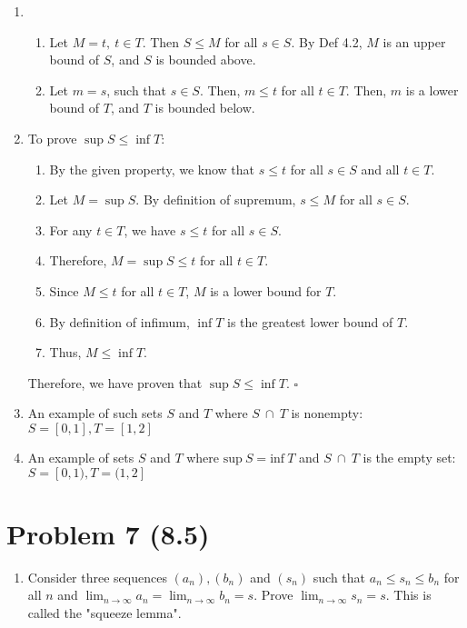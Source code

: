 \documentclass{article}
\begin{document}
\begin{enumerate}
    \item 
    \begin{enumerate}
        \item Let $M=t,\ t \in T$. Then $S\leq M$ for all $s\in S$. By Def 4.2, $M$ is an upper bound of $S$, and $S$ is bounded above.
        \item Let $m=s$, such that $s\in S$. Then, $m\leq t$ for all $t \in T$. Then, $m$ is a lower bound of $T$, and $T$ is bounded below.
    \end{enumerate}
    
    \item To prove $\sup S \leq \inf T$:
    \begin{enumerate}
        \item By the given property, we know that $s \leq t$ for all $s \in S$ and all $t \in T$.
        \item Let $M = \sup S$. By definition of supremum, $s \leq M$ for all $s \in S$.
        \item For any $t \in T$, we have $s \leq t$ for all $s \in S$.
        \item Therefore, $M = \sup S \leq t$ for all $t \in T$.
        \item Since $M \leq t$ for all $t \in T$, $M$ is a lower bound for $T$.
        \item By definition of infimum, $\inf T$ is the greatest lower bound of $T$.
        \item Thus, $M \leq \inf T$.
    \end{enumerate}
    Therefore, we have proven that $\sup S \leq \inf T$. $\square$

    
    \item An example of such sets $S$ and $T$ where $S \ \cap \ T$ is nonempty: $S=[0,1], T=[1,2]$
    
    \item An example of sets $S$ and $T$ where $\text{sup}\ S = \text{inf}\ T$ and $S \ \cap \ T$ is the empty set: $S=[0,1), T=(1,2]$
\end{enumerate}

\section*{Problem 7 (8.5)}
\begin{enumerate}
    \item Consider three sequences $(a_{n}), (b_n)$ and $(s_{n})$ such that $a_{n}\leq s_{n}\leq b_{n}$ for all $n$ and $\lim_{ n \to \infty }a_{n}=\lim_{ n \to \infty }b_{n}=s$. Prove $\lim_{ n \to \infty }s_{n}=s$. This is called the "squeeze lemma".
\end{enumerate}
\end{document}
